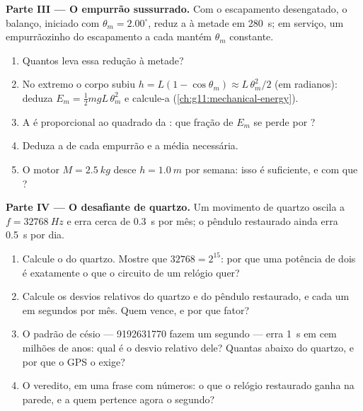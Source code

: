 \begin{problem}
\medskip
\noindent\textbf{Parte III --- O empurrão sussurrado.} Com o escapamento desengatado, o
balanço, iniciado com  $\theta_m = 2.00^\circ$, reduz a  à metade em
\qty{280}{s}; em serviço, um empurrãozinho do escapamento a cada  mantém
$\theta_m$ constante.
\begin{enumerate}[resume]
  \item Quantos  leva essa redução à metade?
  \item No extremo o corpo subiu $h = L(1 - \cos\theta_m) \approx L\,\theta_m^2/2$ (em
        radianos): deduza $E_m = \tfrac12 m g L\,\theta_m^2$ e calcule-a
        (\cref{ch:g11:mechanical-energy}).
  \item A  é proporcional ao quadrado da : que fração de $E_m$ se perde
        por ?
  \item Deduza a  de cada empurrão e a  média necessária.
  \item O  motor $M = \qty{2.5}{kg}$ desce $h = \qty{1.0}{m}$ por semana: isso é
         suficiente, e com que ?
\end{enumerate}

\medskip
\noindent\textbf{Parte IV --- O desafiante de quartzo.} Um movimento de quartzo oscila a
$f = \qty{32768}{Hz}$ e erra cerca de \qty{0.3}{s} por mês; o pêndulo restaurado ainda
erra \qty{0.5}{s} por dia.
\begin{enumerate}[resume]
  \item Calcule o  do quartzo. Mostre que $\num{32768} = 2^{15}$: por que uma
        potência de dois é exatamente o que o circuito de um relógio quer?
  \item Calcule os desvios relativos do quartzo e do pêndulo restaurado, e cada um em
        segundos por mês. Quem vence, e por que fator?
  \item O padrão de césio --- \num{9192631770}  fazem um segundo --- erra
        \qty{1}{s} em cem milhões de anos: qual é o desvio relativo dele? Quantas  abaixo do quartzo, e por que o GPS o exige?
  \item O veredito, em uma frase com números: o que o relógio restaurado ganha na
        parede, e a quem pertence agora o segundo?
\end{enumerate}
\end{problem}
